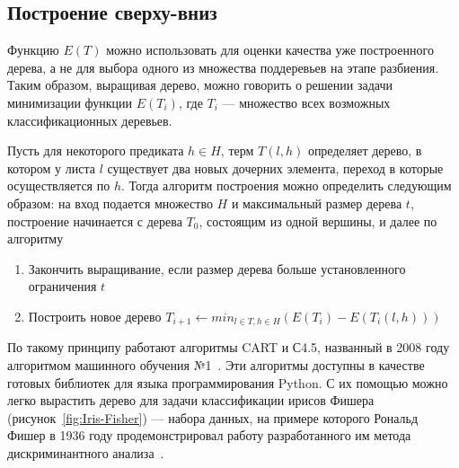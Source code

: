 \documentclass[a4paper,14pt]{extarticle} %
\begin{document}
\subsection{Построение сверху-вниз}
\hspace{\parindent} Функцию $E(T)$ можно использовать для оценки качества уже построенного дерева, а не для выбора одного из множества поддеревьев на этапе разбиения. Таким образом, выращивая дерево, можно говорить о решении задачи минимизации функции $E(T_i)$, где $T_i$ --- множество всех возможных классификационных деревьев. 

Пусть для некоторого предиката $h \in H$, терм $T(l, h)$ определяет дерево, в котором у листа $l$ существует два новых дочерних элемента, переход в которые осуществляется по $h$. Тогда алгоритм построения можно определить следующим образом: на вход подается множество $H$ и максимальный размер дерева $t$, построение начинается с дерева $T_0$, состоящим из одной вершины, и далее по алгоритму

\begin{enumerate}
\item Закончить выращивание, если размер дерева больше установленного ограничения $t$
\item Построить новое дерево $T_{i+1} \leftarrow min_{l \in T, h \in H}(E(T_i)-E(T_i(l, h)))$
\end{enumerate}

По такому принципу работают алгоритмы CART и С4.5, названный в 2008 году алгоритмом машинного обучения №1~\cite{wu2008top}. Эти алгоритмы доступны в качестве готовых библиотек для языка программирования Python. С их помощью можно легко вырастить дерево для задачи классификации ирисов Фишера (рисунок~\ref{fig:Iris-Fisher}) --- набора данных, на примере которого Рональд Фишер в 1936 году продемонстрировал работу разработанного им метода дискриминантного анализа~\cite{fisher1936use}. 
\end{document}
